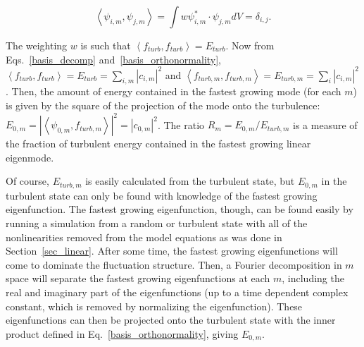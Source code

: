 \documentclass[showpacs,preprintnumbers,amsmath,amssymb,superscriptaddress,aip]{revtex4-1}
\def\beq{\begin{equation}}
\def\eeq{\end{equation}}
\begin{document}
\beq
\label{basis_orthonormality}
\left< \psi_{i,m},\psi_{j,m} \right> = \int w \psi_{i,m}^* \cdot \psi_{j,m} dV = \delta_{i,j}.
\eeq

The weighting $w$ is such that $\left< f_{turb}, f_{turb} \right> = E_{turb}$.
Now from Eqs.~\ref{basis_decomp} and~\ref{basis_orthonormality}, $\left< f_{turb}, f_{turb} \right> = E_{turb} = \sum_{i,m} |c_{i,m}|^2$ and 
$\left< f_{turb,m}, f_{turb,m} \right> = E_{turb,m} = \sum_i |c_{i,m}|^2$.
Then, the amount of energy contained in the fastest growing mode (for each $m$) is given by the square of the projection
of the mode onto the turbulence: $E_{0,m} = \left| \left< \psi_{0,m}, f_{turb,m} \right> \right|^2 = |c_{0,m}|^2$. The ratio 
$R_m = E_{0,m}/E_{turb,m}$ is a measure of the fraction of turbulent energy contained in the fastest growing linear eigenmode. 

Of course, $E_{turb,m}$ is easily calculated from the turbulent state, but $E_{0,m}$ in the 
turbulent state can only be found with knowledge of the fastest growing eigenfunction. The fastest growing eigenfunction, though, can be found easily by running a simulation from a random 
or turbulent state with all of the nonlinearities removed from the model equations as was done in Section~\ref{sec_linear}. After some time, the fastest growing eigenfunctions will come to
dominate the fluctuation structure. Then, a Fourier decomposition in $m$ space will separate the fastest growing eigenfunctions at each $m$, including the real and imaginary part
of the eigenfunctions (up to a time dependent complex constant, which is removed by normalizing the eigenfunction). These eigenfunctions can then be projected onto the turbulent state
with the inner product defined in Eq.~\ref{basis_orthonormality}, giving $E_{0,m}$.
\end{document}
